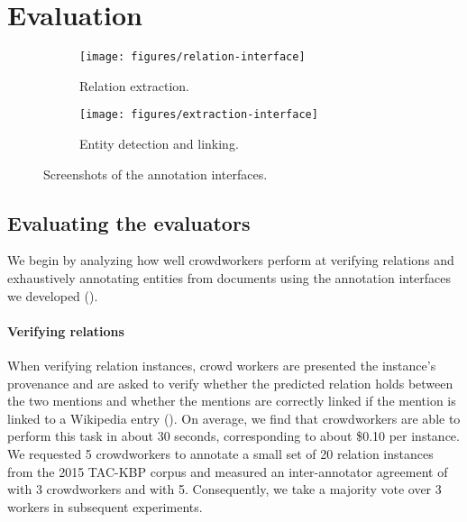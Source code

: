 \section{Evaluation}
\label{sec:evaluation}

\begin{figure*}[h]
\begin{subfigure}{0.49\textwidth}
  \texttt{[image: figures/relation-interface]}
  \caption{\label{fig:relation-interface} Relation extraction.}
\end{subfigure}
\hfill
\begin{subfigure}{0.49\textwidth}
  \texttt{[image: figures/extraction-interface]}
  \caption{\label{fig:entity-interface} Entity detection and linking.}
\end{subfigure}
\caption{\label{fig:interfaces} Screenshots of the annotation interfaces.}
\end{figure*}

\subsection{Evaluating the evaluators}
We begin by analyzing how well crowdworkers perform at verifying relations and exhaustively annotating entities from documents using the annotation interfaces we developed ().%

\paragraph{Verifying relations}
When verifying relation instances, 
  crowd workers are presented the instance's provenance and are asked to verify
  whether the predicted relation holds between the two mentions and
  whether the mentions are correctly linked if the mention is linked to a Wikipedia entry
  (). 
On average, we find that crowdworkers are able to perform this task in about 30 seconds, corresponding to about \$0.10 per instance.
We requested 5 crowdworkers to annotate a small set of 20 relation instances from the 2015 TAC-KBP corpus 
and measured an inter-annotator agreement of  with 3 crowdworkers and  with 5.
Consequently, we take a majority vote over 3 workers in subsequent experiments.

